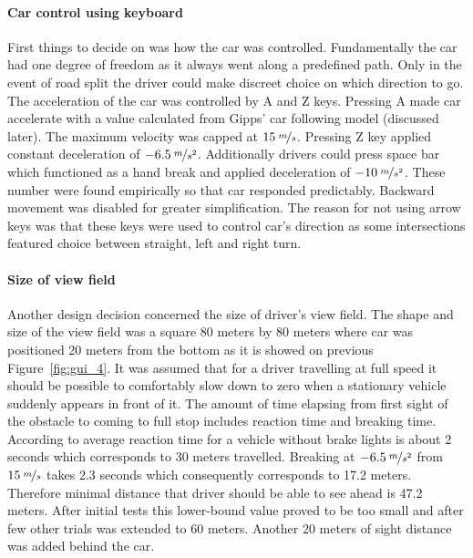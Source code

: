 \documentclass[11pt,english]{article}
\begin{document}
\paragraph{Car control using keyboard}
First things to decide on was how the car was controlled. Fundamentally the car had one degree of freedom as it always went along a predefined path. Only in the event of road split the driver could make discreet choice on which direction to go. The acceleration of the car was controlled by A and Z keys. Pressing A made car accelerate with a value calculated from Gipps' car following model (discussed later). The maximum velocity was capped at $15\:\nicefrac{m}{s}$. Pressing Z key applied constant deceleration of $-6.5\:\nicefrac{m}{s^2}$. Additionally drivers could press space bar which functioned as a hand break and applied deceleration of $-10\:\nicefrac{m}{s^2}$. These number were found empirically so that car responded predictably. Backward movement was disabled for greater simplification.
The reason for not using arrow keys was that these keys were used to control car's direction as some intersections featured choice between straight, left and right turn. 


\paragraph{Size of view field}
Another design decision concerned the size of driver's view field. The shape and size of the view field was a square 80 meters by 80 meters where car was positioned 20 meters from the bottom as it is showed on previous Figure~\ref{fig:gui_4}. It was assumed that for a driver travelling at full speed it should be possible to comfortably slow down to zero when a stationary vehicle suddenly appears in front of it. The amount of time elapsing from first sight of the obstacle to coming to full stop includes reaction time and breaking time. According to \citep{summala1998driving} average reaction time for a vehicle without brake lights is about 2 seconds which corresponds to 30 meters travelled. Breaking at $-6.5\:\nicefrac{m}{s^2}$ from $15\:\nicefrac{m}{s}$ takes 2.3 seconds which consequently corresponds to 17.2 meters. Therefore minimal distance that driver should be able to see ahead is 47.2 meters. After initial tests this lower-bound value proved to be too small and after few other trials was extended to 60 meters. Another 20 meters of sight distance was added behind the car. 
\end{document}
